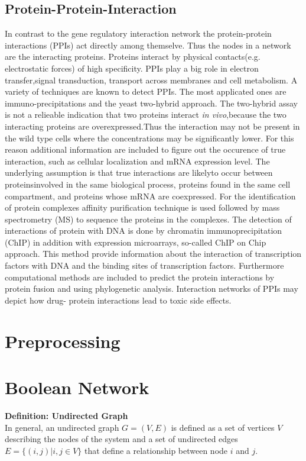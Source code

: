 \subsection*{Protein-Protein-Interaction}
In contrast to the gene regulatory interaction network the protein-protein interactions (PPIs) act directly among themselve. Thus the nodes in a network are the interacting proteins. Proteins interact by physical contacts(e.g. electrostatic forces) of high specificity. PPIs play a big role in electron transfer,signal transduction, transport across membranes and cell metabolism. A variety of techniques are known to detect PPIs. The most applicated ones are immuno-precipitations and the yeast two-hybrid approach. The two-hybrid assay is not a relieable indication that two proteins interact \textit{in vivo},because the two interacting proteins are overexpressed.Thus the interaction may not be present in the wild type cells where the concentrations may be significantly lower. For this reason additional information are included to figure out the occurence of true interaction, such as cellular localization and mRNA expression level. The underlying assumption is that true interactions are likelyto occur between proteinsinvolved in the same biological process, proteins found in the same cell compartment, and proteins whose mRNA are coexpressed.
For the identification of protein complexes affinity purification technique is used followed by mass spectrometry (MS) to sequence the proteins in the complexes. The detection of interactions of protein with DNA is done by chromatin immunoprecipitation (ChIP) in addition with expression microarrays, so-called ChIP on Chip approach. This method provide information about the interaction of transcription factors with DNA and the binding sites of transcription factors. Furthermore computational methods are included to predict the protein interactions by protein fusion and using phylogenetic analysis. Interaction networks of PPIs may depict how drug- protein interactions lead to toxic side effects.
\citep{doi:10.1586/14789450.1.2.239}

\newpage
\section{Preprocessing}

\newpage
\section{Boolean Network}
\textbf{Definition: Undirected Graph}\\
In general, an undirected graph $G=(V,E)$ is defined as a set of vertices $V$ describing the nodes of the system and a set of undirected edges $E = \{ (i,j)|i,j\in V\} $ that define a relationship between node $i$ and $j$.\\

